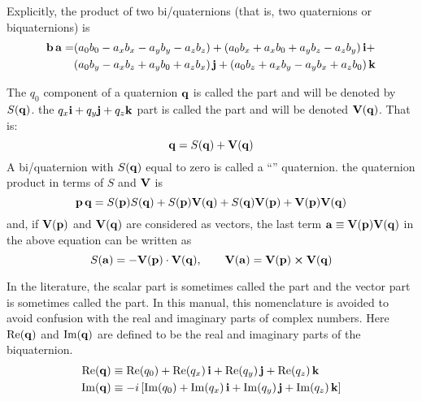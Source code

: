 Explicitly, the product of two bi/quaternions (that is, two quaternions or biquaternions) is
\begin{align}
  {\bf b} \, {\bf a} = &(a_0 b_0 - a_x b_x - a_y b_y - a_z b_z) +
                  (a_0 b_x + a_x b_0 + a_y b_z - a_z b_y) \, {\bf i} + \\
                 &(a_0 b_y - a_x b_z + a_y b_0 + a_z b_x) \, {\bf j} +
                  (a_0 b_z + a_x b_y - a_y b_x + a_z b_0) \, {\bf k} \nonumber
\end{align}

The $q_0$ component of a quaternion ${\bf q}$ is called the  part and will be denoted by
$S({\bf q})$.  the $q_x {\bf i} + q_y {\bf j} + q_z {\bf k}$ part is called the  part and will be
denoted ${\bf V}({\bf q})$. That is:
\begin{equation}
  {\bf q} = S({\bf q}) + {\bf V}({\bf q})
\end{equation}
A bi/quaternion with $S({\bf q})$ equal to zero is called a ``'' quaternion.
the quaternion product in terms of $S$ and ${\bf V}$ is
\begin{equation}
  {\bf p} \, {\bf q} = S({\bf p}) S({\bf q}) + S({\bf p}) {\bf V}({\bf q}) + S({\bf q}) {\bf V}({\bf p}) + {\bf V}({\bf p}) {\bf V}({\bf q})
\end{equation}
and, if ${\bf V}({\bf p})$ and ${\bf V}({\bf q})$ are considered as vectors, the last term ${\bf a} \equiv
{\bf V}({\bf p}) {\bf V}({\bf q})$ in the above equation can be written as
\begin{equation}
  S({\bf a}) = -{\bf V}({\bf p}) \cdot {\bf V}({\bf q}), \qquad {\bf V}({\bf a}) = {\bf V}({\bf p}) \mathbin{\boldsymbol{\times}} {\bf V}({\bf q})
\end{equation}

In the literature, the scalar part is sometimes called the  part and the vector part is
sometimes called the  part. In this manual, this nomenclature is avoided to avoid
confusion with the real and imaginary parts of complex numbers. Here $\operatorname{Re}({\bf q})$ and $\operatorname{Im}({\bf q})$ are
defined to be the real and imaginary parts of the biquaternion.
\begin{align}
  \operatorname{Re}({\bf q}) &\equiv \operatorname{Re}(q_0) + \operatorname{Re}(q_x) \, {\bf i} + \operatorname{Re}(q_y) \, {\bf j} + \operatorname{Re}(q_z) \, {\bf k} \nonumber \\
  \operatorname{Im}({\bf q}) &\equiv -i \left[ \operatorname{Im}(q_0) + \operatorname{Im}(q_x) \, {\bf i} + \operatorname{Im}(q_y) \, {\bf j} + \operatorname{Im}(q_z) \, {\bf k} \right]
\end{align}

